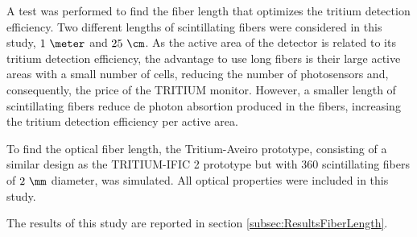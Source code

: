 A test was performed to find the fiber length that optimizes the tritium detection efficiency. Two different lengths of scintillating fibers were considered in this study, $1~\meter$ and $25~\cm$. As the active area of the detector is related to its tritium detection efficiency, the advantage to use long fibers is their large active areas with a small number of cells, reducing the number of photosensors and, consequently, the price of the TRITIUM monitor. However, a smaller length of scintillating fibers reduce de photon absortion produced in the fibers, increasing the tritium detection efficiency per active area.

To find the optical fiber length, the Tritium-Aveiro prototype, consisting of a similar design as the TRITIUM-IFIC 2 prototype but with $360$ scintillating fibers of $2~\mm$ diameter, was simulated. All optical properties were included in this study.

The results of this study are reported in section \ref{subsec:ResultsFiberLength}.